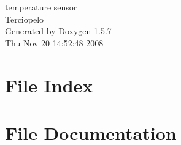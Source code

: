 \documentclass[a4paper]{book}
\begin{document}
\begin{titlepage}
\vspace*{7cm}
\begin{center}
{\Large temperature sensor \\[1ex]\large Terciopelo }\\
\vspace*{1cm}
{\large Generated by Doxygen 1.5.7}\\
\vspace*{0.5cm}
{\small Thu Nov 20 14:52:48 2008}\\
\end{center}
\end{titlepage}
\clearemptydoublepage
{}
\tableofcontents
\clearemptydoublepage
{}
\chapter{File Index}

\chapter{File Documentation}















\printindex
\end{document}
